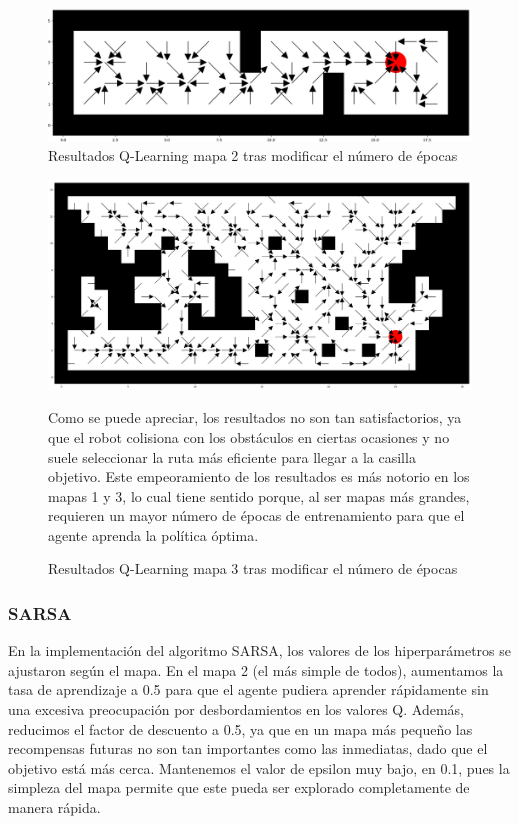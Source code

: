 \documentclass[conference,a4paper]{IEEEtran}
\begin{document}
\begin{figure}[h]
  \centering
  \includegraphics[scale=0.33]{resultado_2_qlearning_mapa_2}
  \caption{Resultados Q-Learning mapa 2 tras modificar el número de épocas}
  \label{fig:resultado_2_qlearning_mapa_2}
\end{figure}

\begin{figure}[h]
  \includegraphics[scale=0.33]{resultado_2_qlearning_mapa_3}
  \caption{Resultados Q-Learning mapa 3 tras modificar el número de épocas}
  \label{fig:resultado_2_qlearning_mapa_3}
  \vspace{0.5cm}
  Como se puede apreciar, los resultados no son tan satisfactorios, ya que el robot colisiona con los obstáculos en ciertas ocasiones y no suele seleccionar la ruta más eficiente para llegar a la casilla objetivo. 
  Este empeoramiento de los resultados es más notorio en los mapas 1 y 3, lo cual tiene sentido porque, al ser mapas más grandes, requieren un mayor número de épocas de entrenamiento para que el agente aprenda la política óptima.\newline
\end{figure}

\subsubsection{\textbf{SARSA}}

En la implementación del algoritmo SARSA, los valores de los hiperparámetros se ajustaron según el mapa. En el mapa 2 (el más simple de todos), aumentamos la tasa de aprendizaje a 0.5 para que el agente pudiera aprender rápidamente sin una excesiva preocupación por desbordamientos en los valores Q.
Además, reducimos el factor de descuento a 0.5, ya que en un mapa más pequeño las recompensas futuras no son tan importantes como las inmediatas, dado que el objetivo está más cerca.
Mantenemos el valor de epsilon muy bajo, en 0.1, pues la simpleza del mapa permite que este pueda ser explorado completamente de manera rápida.\newline
\end{document}
